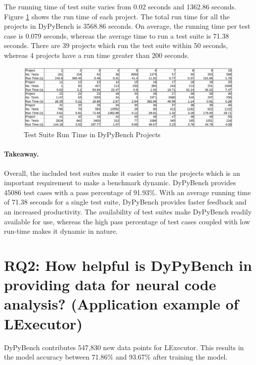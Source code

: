 The running time of test suite varies from 0.02 seconds and 1362.86 seconds.
Figure \ref{fig:test_run_times} shows the run time of each project.
The total run time for all the projects in DyPyBench is 3568.86 seconds.
On average, the running time per test case is 0.079 seconds, whereas the average time to run a test suite is 71.38 seconds. 
There are 39 projects which run the test suite within 50 seconds, whereas 4 projects have a run time greater than 200 seconds.
\begin{figure}[ht]
    \centering
    \includegraphics[width=1\linewidth]{figures/evaluation/tests_runtime2.png}
    \caption[Test Suite Run Time]{\label{fig:test_run_times}Test Suite Run Time in DyPyBench Projects}
\end{figure}

\paragraph{Takeaway.} Overall, the included test suites make it easier to run the projects which is an important requirement to make a benchmark dynamic.
DyPyBench provides 45086 test cases with a pass percentage of 91.93\%. 
With an average running time of 71.38 seconds for a single test suite, DyPyBench provides faster feedback and an increased productivity.
The availability of test suites make DyPyBench readily available for use, whereas the high pass percentage of test cases coupled with low run-time makes it dynamic in nature.

\section{RQ2: How helpful is DyPyBench in providing data for neural code analysis? (Application example of LExecutor)}

DyPyBench contributes 547,830 new data points for LExecutor. 
This results in the model accuracy between 71.86\% and 93.67\% after training the model.

